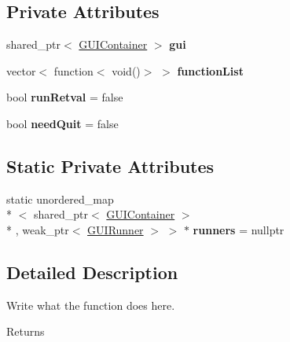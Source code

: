 \subsection*{Private Attributes}
\begin{DoxyCompactItemize}
\item 
\hypertarget{classGUIRunner_ad60838d742eaccba8a58b135f752621d}{shared\+\_\+ptr$<$ \hyperlink{classGUIContainer}{G\+U\+I\+Container} $>$ {\bfseries gui}}\label{classGUIRunner_ad60838d742eaccba8a58b135f752621d}

\item 
\hypertarget{classGUIRunner_a2cc56b998bbe4e30c760146648d7dee8}{vector$<$ function$<$ void()$>$ $>$ {\bfseries function\+List}}\label{classGUIRunner_a2cc56b998bbe4e30c760146648d7dee8}

\item 
\hypertarget{classGUIRunner_a19cbe217b41b144355edbcda2f482680}{bool {\bfseries run\+Retval} = false}\label{classGUIRunner_a19cbe217b41b144355edbcda2f482680}

\item 
\hypertarget{classGUIRunner_a2cec6973d0f9e098dbfdf1849b36b3f0}{bool {\bfseries need\+Quit} = false}\label{classGUIRunner_a2cec6973d0f9e098dbfdf1849b36b3f0}

\end{DoxyCompactItemize}
\subsection*{Static Private Attributes}
\begin{DoxyCompactItemize}
\item 
\hypertarget{classGUIRunner_adeced5f9556e581c711ffef78b992356}{static unordered\+\_\+map\\*
$<$ shared\+\_\+ptr$<$ \hyperlink{classGUIContainer}{G\+U\+I\+Container} $>$\\*
, weak\+\_\+ptr$<$ \hyperlink{classGUIRunner}{G\+U\+I\+Runner} $>$ $>$ $\ast$ {\bfseries runners} = nullptr}\label{classGUIRunner_adeced5f9556e581c711ffef78b992356}

\end{DoxyCompactItemize}


\subsection{Detailed Description}
Write what the function does here. 

\begin{DoxyReturn}{Returns}

\end{DoxyReturn}


